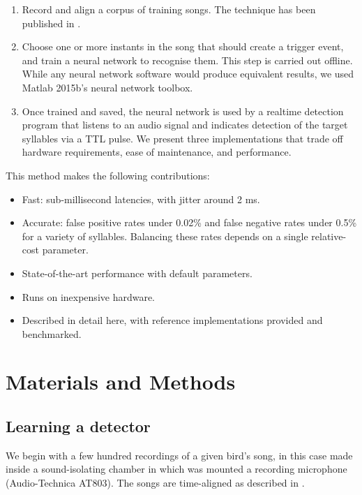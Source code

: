 \documentclass[10pt,letterpaper]{article}
\begin{document}
\begin{enumerate}
\item Record and align a corpus of training songs.  The technique has been published in \cite{Poole2012}.
\item Choose one or more instants in the song that should create a trigger event, and train a
  neural network to recognise them. This step is carried out offline.  While any neural network software would produce equivalent results, we used Matlab 2015b's neural network toolbox.
\item Once trained and saved, the neural network is used by a realtime
  detection program that listens to an audio signal and indicates detection of the target
  syllables via a TTL pulse.  We present three implementations that trade off hardware requirements, ease of maintenance, and performance.
\end{enumerate}
This method makes the following contributions:
\begin{itemize}
\item Fast: sub-millisecond latencies, with jitter around 2 ms.
\item Accurate: false positive rates under 0.02\% and false negative rates under 0.5\% for a variety of syllables.  Balancing these rates depends on a single relative-cost parameter.
\item State-of-the-art performance with default parameters.
\item Runs on inexpensive hardware.
\item Described in detail here, with reference implementations provided and benchmarked.
\end{itemize}



\section{Materials and Methods}
\label{sec:method}

\subsection{Learning a detector}

We begin with a few hundred recordings of a given bird's
song, in this case made inside a sound-isolating chamber in which was mounted a recording microphone (Audio-Technica AT803).  The songs are time-aligned as described in \cite{Poole2012}.
\end{document}
